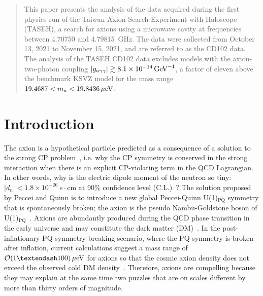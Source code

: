 \documentclass[%
reprint, %
superscriptaddress,
 amsmath,amssymb,
 aps
]{revtex4-2}
\begin{document}

\begin{abstract}
This paper presents the analysis of the data acquired during the first 
physics run of the Taiwan Axion Search Experiment with Haloscope (TASEH), 
a search for axions using a microwave cavity at frequencies between 4.70750 
and 4.79815~GHz. The data were collected from October 13, 2021 to November 15,
 2021, and are referred to as the CD102 data. The analysis of the TASEH CD102 
data excludes models with the axion-two-photon coupling 
$\left|g_{a\gamma\gamma}\right|\gtrsim 8.1\times 10^{-14}\,\text{Ge\hspace{-.08em}V}^{-1}$, a factor of eleven above the benchmark 
KSVZ model for the mass range 
$19.4687 < m_a < 19.8436 \,\mu\text{e\hspace{-.08em}V}$. 
\end{abstract}

\maketitle

\section{Introduction} \label{sec:intro}
The axion is a hypothetical particle predicted as a consequence of a  
solution to the strong CP problem~\cite{strongCPI,strongCPII,strongCPIII}, 
i.e. why the CP symmetry is conserved in the strong 
interaction when there is an explicit CP-violating term in the QCD 
Lagrangian. In other words, why is the electric dipole moment 
of the neutron so tiny:  
$\left|d_n\right| < 1.8 \times10^{-26}~e\cdot\mathrm{cm}$ at 90\% 
confidence level (C.L.)~\cite{EDM,PDG}? 
The solution proposed by Peccei and Quinn is to introduce a new global 
Peccei-Quinn U(1)$_\mathrm{PQ}$ symmetry that is spontaneously broken; the 
axion is the pseudo Nambu-Goldstone boson of 
U(1)$_\mathrm{PQ}$~\cite{strongCPI}. 
Axions are abundantly produced during the QCD phase transition in 
the early universe and may constitute the dark matter 
(DM)~\cite{ADDONI,ADDONII,ADDONIII,ADDONIV}. 
In the post-inflationary PQ symmetry breaking scenario, where the PQ symmetry
is broken after inflation, current calculations suggest a mass range of 
${\cal O}(1–100)\,\mu\text{e\hspace{-.08em}V}$ for axions so that the cosmic 
axion density does not exceed the 
observed cold DM density~\cite{QCDCalI,QCDCalII,QCDCalIII,QCDCalIV,QCDCalV,QCDCalVI,QCDCalVII,QCDCalVIII,QCDCalIX,QCDCalX,QCDCalXI,QCDCalXII,QCDCalXIII,QCDCalXIV}. 
Therefore, axions are compelling because they may explain at the same 
time two puzzles that are on scales different by more than thirty orders of 
magnitude. 
\end{document}
